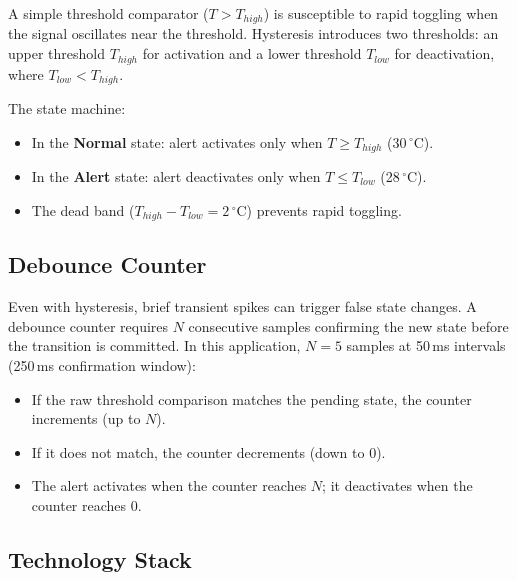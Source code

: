 \documentclass[12pt]{article}
\begin{document}
A simple threshold comparator (\(T > T_{high}\)) is susceptible to rapid toggling when the signal oscillates near the threshold. Hysteresis introduces two thresholds: an upper threshold \(T_{high}\) for activation and a lower threshold \(T_{low}\) for deactivation, where \(T_{low} < T_{high}\).

The state machine:
\begin{itemize}
  \item In the \textbf{Normal} state: alert activates only when \(T \geq T_{high}\) (30\,\(^{\circ}\)C).
  \item In the \textbf{Alert} state: alert deactivates only when \(T \leq T_{low}\) (28\,\(^{\circ}\)C).
  \item The dead band (\(T_{high} - T_{low} = 2\,^{\circ}\)C) prevents rapid toggling.
\end{itemize}

\subsection{Debounce Counter}

Even with hysteresis, brief transient spikes can trigger false state changes. A debounce counter requires \(N\) consecutive samples confirming the new state before the transition is committed. In this application, \(N = 5\) samples at 50\,ms intervals (250\,ms confirmation window):
\begin{itemize}
  \item If the raw threshold comparison matches the pending state, the counter increments (up to \(N\)).
  \item If it does not match, the counter decrements (down to 0).
  \item The alert activates when the counter reaches \(N\); it deactivates when the counter reaches 0.
\end{itemize}

\subsection{Technology Stack}
\end{document}
